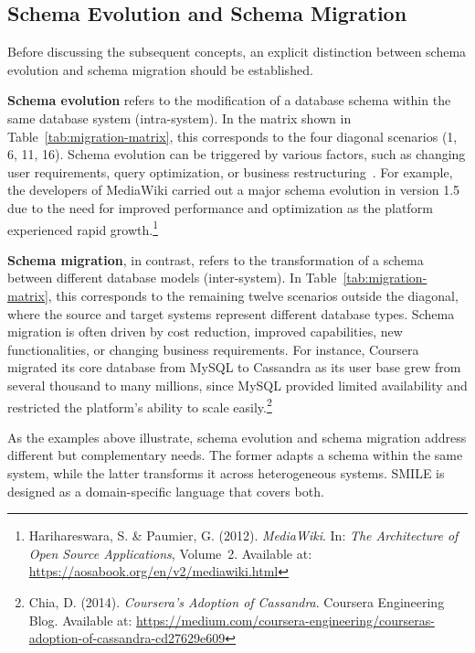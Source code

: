%
%
\subsection{Schema Evolution and Schema Migration}
\label{sec:stateoftheart:fundamentals:evomig}
Before discussing the subsequent concepts, an explicit distinction between schema evolution and schema migration should be established.

\textbf{Schema evolution} refers to the modification of a database schema within
the same database system (intra-system). In the matrix shown in
Table~\ref{tab:migration-matrix}, this corresponds to the four diagonal scenarios
(1, 6, 11, 16). Schema evolution can be triggered by various factors, such as changing user requirements, query optimization, or business restructuring~\cite{brahmia2024literature}. For example, the developers of MediaWiki
carried out a major schema evolution in version 1.5 due to the need for
improved performance and optimization as the platform experienced rapid
growth.\footnote{Harihareswara, S. \& Paumier, G. (2012). \textit{MediaWiki}.
In: \textit{The Architecture of Open Source Applications}, Volume~2. Available
at: \url{https://aosabook.org/en/v2/mediawiki.html}}

\textbf{Schema migration}, in contrast, refers to the transformation of a schema
between different database models (inter-system). In
Table~\ref{tab:migration-matrix}, this corresponds to the remaining twelve
scenarios outside the diagonal, where the source and target systems represent
different database types. Schema migration is often driven by cost reduction, improved capabilities,
new functionalities, or changing business requirements. For instance, Coursera
migrated its core database from MySQL to Cassandra as its user base grew from
several thousand to many millions, since MySQL provided limited availability and
restricted the platform's ability to scale
easily.\footnote{Chia, D. (2014). \textit{Coursera's Adoption of Cassandra}.
Coursera Engineering Blog. Available at:
\url{https://medium.com/coursera-engineering/courseras-adoption-of-cassandra-cd27629e609}}

As the examples above illustrate, schema evolution and schema migration address different but complementary needs. The former adapts a schema within the same system, while the latter transforms it across heterogeneous systems. SMILE  is designed as a domain-specific language that covers both.

